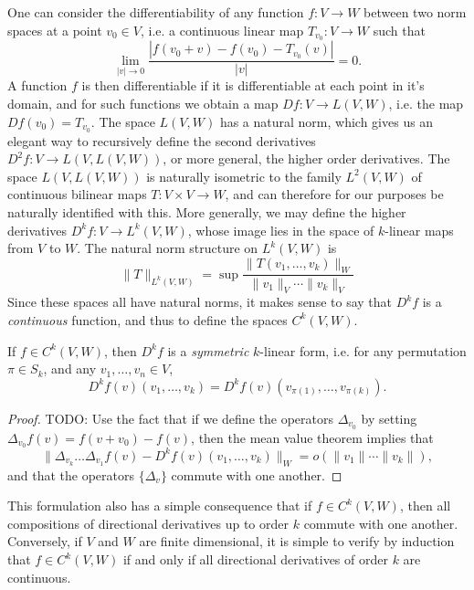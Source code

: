 One can consider the differentiability of any function $f: V \to W$ between two norm spaces at a point $v_0 \in V$, i.e. a continuous linear map $T_{v_0}: V \to W$ such that
%
\[ \lim_{|v| \to 0} \frac{|f(v_0 + v) - f(v_0) - T_{v_0}(v)|}{|v|} = 0. \]
%
A function $f$ is then differentiable if it is differentiable at each point in it's domain, and for such functions we obtain a map $Df: V \to L(V,W)$, i.e. the map $Df(v_0) = T_{v_0}$. The space $L(V,W)$ has a natural norm, which gives us an elegant way to recursively define the second derivatives $D^2 f: V \to L(V,L(V,W))$, or more general, the higher order derivatives. The space $L(V,L(V,W))$ is naturally isometric to the family $L^2(V,W)$ of continuous bilinear maps $T: V \times V \to W$, and can therefore for our purposes be naturally identified with this. More generally, we may define the higher derivatives $D^k f: V \to L^k(V,W)$, whose image lies in the space of $k$-linear maps from $V$ to $W$. The natural norm structure on $L^k(V,W)$ is
%
\[ \| T \|_{L^k(V,W)} = \sup \frac{\|T(v_1,\dots,v_k)\|_W}{\| v_1 \|_V \cdots \| v_k \|_V} \]
%
Since these spaces all have natural norms, it makes sense to say that $D^k f$ is a \emph{continuous} function, and thus to define the spaces $C^k(V,W)$.

\begin{theorem}
    If $f \in C^k(V,W)$, then $D^k f$ is a \emph{symmetric} $k$-linear form, i.e. for any permutation $\pi \in S_k$, and any $v_1,\dots,v_n \in V$,
    \[ D^kf(v)(v_1,\dots,v_k) = D^kf(v)(v_{\pi(1)}, \dots, v_{\pi(k)}). \]
\end{theorem}
\begin{proof}
    TODO: Use the fact that if we define the operators $\Delta_{v_0}$ by setting $\Delta_{v_0} f(v) = f(v + v_0) - f(v)$, then the mean value theorem implies that
    \[ \| \Delta_{v_k} \dots \Delta_{v_1} f(v) - D^k f(v)(v_1,\dots,v_k) \|_W = o \left( \| v_1 \| \cdots \| v_k \| \right), \]
    and that the operators $\{ \Delta_v \}$ commute with one another.
\end{proof}

\begin{remark}
    This formulation also has a simple consequence that if $f \in C^k(V,W)$, then all compositions of directional derivatives up to order $k$ commute with one another. Conversely, if $V$ and $W$ are finite dimensional, it is simple to verify by induction that $f \in C^k(V,W)$ if and only if all directional derivatives of order $k$ are continuous.
\end{remark}

